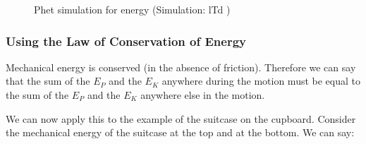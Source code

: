     \setcounter{subfigure}{0}


	\begin{figure}[H] %
    
    
    \textnormal{Phet simulation for energy}\vspace{.1in} \nopagebreak
  \label{m38806*phet!!!underscore!!!sim}\label{m38806*phet-simulation}
             { (Simulation:  lTd )}
      
      \vspace{2pt}
    \vspace{.1in}
    
    

 \end{figure}   

    \addtocounter{footnote}{-0}
    \par 
      
      \label{m38786*uid79}
            \subsubsection{ Using the Law of Conservation of Energy}
            \nopagebreak
            
        
        \label{m38786*id68660}Mechanical energy is conserved (in the absence of friction). Therefore we can say that the sum of the \begin{math}{E}_{P}\end{math} and the \begin{math}{E}_{K}\end{math} anywhere during the motion must be equal to the sum of the \begin{math}{E}_{P}\end{math} and the \begin{math}{E}_{K}\end{math} anywhere else in the motion.\par 
        \label{m38786*id68713}We can now apply this to the example of the suitcase on the cupboard. Consider the mechanical energy of the suitcase at the top and at the bottom. We can say:\par 
        \label{m38786*id68720}
          
    \setcounter{subfigure}{0}


